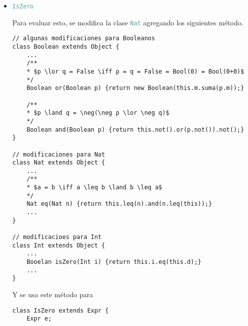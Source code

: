 \documentclass{article}
\newcommand{\tp}[1]{\textcolor{CadetBlue} {\texttt{#1}}}
\begin{document}
\begin{enumerate}
\begin{enumerate}
\begin{itemize}
\begin{verbatim}
    // $-(a, b) = (b, a)$
    Int neg() {return new Int(this.d, this.i);}
}
                \end{verbatim}

                Hay que modificar la clase de \tp{NumExpr} para manejar enteros
                \begin{verbatim}
// modificaciones para manejar enteros
class NumExpr extends Expr {
    Int v;

    NumExpr(Int v) {super(); this.v = v;}
    ...
}
                \end{verbatim}

                Y con estas nuevas modificaciones se define \tp{NegExpr}
                \begin{verbatim}
// manejar expresiones con negativos
class NegExpr extends Expr {
    Expr e;

    NegExpr(Expr e) {this.e = e;}

    Boolean isAtom() {return (new Booelan(new Nat(this))).false();}

    Expr eval() {return this.e.eval().neg();}
}
                \end{verbatim}
                \item \tp{IsZero}

                Para evaluar esto, se modifica la clase \tp{Nat} agregando los
                siguientes método.

                \begin{verbatim}
// algunas modificaciones para Booleanos
class Boolean extends Object {
    ...
    /**
    * $p \lor q = False \iff p = q = False = Bool(0) = Bool(0+0)$
    */
    Boolean or(Boolean p) {return new Boolean(this.m.suma(p.m));}

    /**
    * $p \land q = \neg(\neg p \lor \neg q)$
    */
    Boolean and(Boolean p) {return this.not().or(p.not()).not();}
}

// modificaciones para Nat
class Nat extends Object {
    ...
    /**
    * $a = b \iff a \leq b \land b \leq a$
    */
    Nat eq(Nat n) {return this.leq(n).and(n.leq(this));}
    ...
}

// modificacioes para Int
class Int extends Object {
    ...
    Booelan isZero(Int i) {return this.i.eq(this.d);}
    ...
}
                \end{verbatim}

                Y se usa este método para

                \begin{verbatim}
class IsZero extends Expr {
    Expr e;


\end{verbatim}
\end{itemize}
\end{enumerate}
\end{enumerate}
\end{document}
